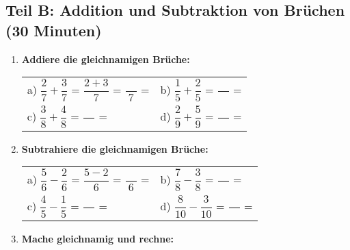 \subsection*{Teil B: Addition und Subtraktion von Brüchen (30 Minuten)}

\begin{enumerate}[label=\arabic*.]
    \item \textbf{Addiere die gleichnamigen Brüche:}
    \vspace{0.5cm}

    \begin{tabular}{ll}
        a) $\dfrac{2}{7} + \dfrac{3}{7}$ = $\dfrac{2+3}{7}$ = $\dfrac{\phantom{00}}{7}$ = \underline{\hspace{3cm}} & b) $\dfrac{1}{5} + \dfrac{2}{5}$ = $\dfrac{\phantom{00}}{\phantom{00}}$ = \underline{\hspace{3cm}} \\[4ex]
        c) $\dfrac{3}{8} + \dfrac{4}{8}$ = $\dfrac{\phantom{00}}{\phantom{00}}$ = \underline{\hspace{3cm}} & d) $\dfrac{2}{9} + \dfrac{5}{9}$ = $\dfrac{\phantom{00}}{\phantom{00}}$ = \underline{\hspace{3cm}}
    \end{tabular}

    \vspace{1cm}

    \item \textbf{Subtrahiere die gleichnamigen Brüche:}
    \vspace{0.5cm}

    \begin{tabular}{ll}
        a) $\dfrac{5}{6} - \dfrac{2}{6}$ = $\dfrac{5-2}{6}$ = $\dfrac{\phantom{00}}{6}$ = \underline{\hspace{3cm}} & b) $\dfrac{7}{8} - \dfrac{3}{8}$ = $\dfrac{\phantom{00}}{\phantom{00}}$ = \underline{\hspace{3cm}} \\[4ex]
        c) $\dfrac{4}{5} - \dfrac{1}{5}$ = $\dfrac{\phantom{00}}{\phantom{00}}$ = \underline{\hspace{3cm}} & d) $\dfrac{8}{10} - \dfrac{3}{10}$ = $\dfrac{\phantom{00}}{\phantom{00}}$ = \underline{\hspace{3cm}}
    \end{tabular}

    \vspace{1cm}

    \item \textbf{Mache gleichnamig und rechne:}


\end{enumerate}
